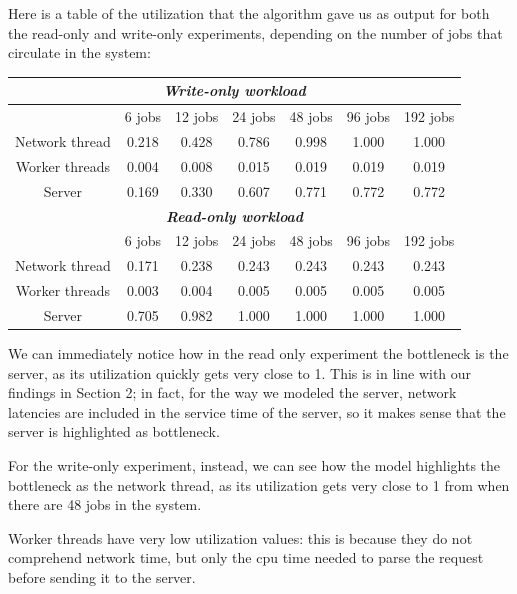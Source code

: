 \documentclass[11pt,a4paper]{article}
\begin{document}
Here is a table of the utilization that the algorithm gave us as output 
for both the read-only and write-only experiments, depending on the 
number of jobs that circulate in the system:

\begin{table}[H]
\centering
\begin{tabular}{@{}ccccccc@{}}
\toprule
\multicolumn{7}{c}{\textit{\textbf{Write-only workload}}} \\ \midrule
 & 6 jobs & 12 jobs & 24 jobs & 48 jobs & 96 jobs & 192 jobs \\ \midrule
\multicolumn{1}{c|}{Network thread} & 0.218 & 0.428 & 0.786 & 0.998 & 1.000 & 1.000 \\
\multicolumn{1}{c|}{Worker threads} & 0.004 & 0.008 & 0.015 & 0.019 & 0.019 & 0.019 \\
\multicolumn{1}{c|}{Server} & 0.169 & 0.330 & 0.607 & 0.771 & 0.772 & 0.772 \\ \midrule
\multicolumn{7}{c}{\textit{\textbf{Read-only workload}}} \\ \midrule
 & 6 jobs & 12 jobs & 24 jobs & 48 jobs & 96 jobs & 192 jobs \\ \midrule
\multicolumn{1}{c|}{Network thread} & 0.171 & 0.238 & 0.243 & 0.243 & 0.243 & 0.243 \\
\multicolumn{1}{c|}{Worker threads} & 0.003 & 0.004 & 0.005 & 0.005 & 0.005 & 0.005 \\
\multicolumn{1}{c|}{Server} & 0.705 & 0.982 & 1.000 & 1.000 & 1.000 & 1.000 \\ \bottomrule
\end{tabular}
\end{table}

We can immediately notice how in the read only experiment the bottleneck is the server, as
its utilization quickly gets very close to 1. This is in line with our findings in Section 2; in
fact, for the way we modeled the server, network latencies are included in the service time of
the server, so it makes sense that the server is highlighted as bottleneck.

For the write-only experiment, instead, we can see how the model highlights the bottleneck as 
the network thread, as its utilization gets very close to 1 from when there are 48 jobs in the system.

Worker threads have very low utilization values: this is because they do not comprehend network time, 
but only the cpu time needed to parse the request before sending it to the server. 
\end{document}
